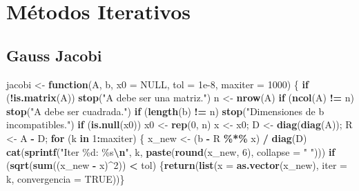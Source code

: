 \documentclass[
]{book}
\newenvironment{Shaded}{\begin{snugshade}}{\end{snugshade}}
\newcommand{\AttributeTok}[1]{\textcolor[rgb]{0.13,0.29,0.53}{#1}}
\newcommand{\ConstantTok}[1]{\textcolor[rgb]{0.56,0.35,0.01}{#1}}
\newcommand{\ControlFlowTok}[1]{\textcolor[rgb]{0.13,0.29,0.53}{\textbf{#1}}}
\newcommand{\DecValTok}[1]{\textcolor[rgb]{0.00,0.00,0.81}{#1}}
\newcommand{\FloatTok}[1]{\textcolor[rgb]{0.00,0.00,0.81}{#1}}
\newcommand{\FunctionTok}[1]{\textcolor[rgb]{0.13,0.29,0.53}{\textbf{#1}}}
\newcommand{\NormalTok}[1]{#1}
\newcommand{\OtherTok}[1]{\textcolor[rgb]{0.56,0.35,0.01}{#1}}
\newcommand{\SpecialCharTok}[1]{\textcolor[rgb]{0.81,0.36,0.00}{\textbf{#1}}}
\newcommand{\StringTok}[1]{\textcolor[rgb]{0.31,0.60,0.02}{#1}}
\begin{document}
\chapter{Métodos Iterativos}\label{muxe9todos-iterativos}

\section{Gauss Jacobi}\label{gauss-jacobi}

\begin{Shaded}
\begin{Highlighting}[]
\NormalTok{jacobi }\OtherTok{\textless{}{-}} \ControlFlowTok{function}\NormalTok{(A, b, }\AttributeTok{x0 =} \ConstantTok{NULL}\NormalTok{, }\AttributeTok{tol =} \FloatTok{1e{-}8}\NormalTok{, }\AttributeTok{maxiter =} \DecValTok{1000}\NormalTok{) \{}
  \ControlFlowTok{if}\NormalTok{ (}\SpecialCharTok{!}\FunctionTok{is.matrix}\NormalTok{(A)) }\FunctionTok{stop}\NormalTok{(}\StringTok{"A debe ser una matriz."}\NormalTok{)}
\NormalTok{  n }\OtherTok{\textless{}{-}} \FunctionTok{nrow}\NormalTok{(A)}
  \ControlFlowTok{if}\NormalTok{ (}\FunctionTok{ncol}\NormalTok{(A) }\SpecialCharTok{!=}\NormalTok{ n) }\FunctionTok{stop}\NormalTok{(}\StringTok{"A debe ser cuadrada."}\NormalTok{)}
  \ControlFlowTok{if}\NormalTok{ (}\FunctionTok{length}\NormalTok{(b) }\SpecialCharTok{!=}\NormalTok{ n) }\FunctionTok{stop}\NormalTok{(}\StringTok{"Dimensiones de b incompatibles."}\NormalTok{)}
  \ControlFlowTok{if}\NormalTok{ (}\FunctionTok{is.null}\NormalTok{(x0)) x0 }\OtherTok{\textless{}{-}} \FunctionTok{rep}\NormalTok{(}\DecValTok{0}\NormalTok{, n)}
\NormalTok{  x }\OtherTok{\textless{}{-}}\NormalTok{ x0;  D }\OtherTok{\textless{}{-}} \FunctionTok{diag}\NormalTok{(}\FunctionTok{diag}\NormalTok{(A));  R }\OtherTok{\textless{}{-}}\NormalTok{ A }\SpecialCharTok{{-}}\NormalTok{ D;}
  \ControlFlowTok{for}\NormalTok{ (k }\ControlFlowTok{in} \DecValTok{1}\SpecialCharTok{:}\NormalTok{maxiter) \{}
\NormalTok{    x\_new }\OtherTok{\textless{}{-}}\NormalTok{ (b }\SpecialCharTok{{-}}\NormalTok{ R }\SpecialCharTok{\%*\%}\NormalTok{ x) }\SpecialCharTok{/} \FunctionTok{diag}\NormalTok{(D)}
    \FunctionTok{cat}\NormalTok{(}\FunctionTok{sprintf}\NormalTok{(}\StringTok{"Iter \%d: \%s}\SpecialCharTok{\textbackslash{}n}\StringTok{"}\NormalTok{, k, }\FunctionTok{paste}\NormalTok{(}\FunctionTok{round}\NormalTok{(x\_new, }\DecValTok{6}\NormalTok{), }\AttributeTok{collapse =} \StringTok{" "}\NormalTok{)))}
    \ControlFlowTok{if}\NormalTok{ (}\FunctionTok{sqrt}\NormalTok{(}\FunctionTok{sum}\NormalTok{((x\_new }\SpecialCharTok{{-}}\NormalTok{ x)}\SpecialCharTok{\^{}}\DecValTok{2}\NormalTok{)) }\SpecialCharTok{\textless{}}\NormalTok{ tol) \{}\FunctionTok{return}\NormalTok{(}\FunctionTok{list}\NormalTok{(}\AttributeTok{x =} \FunctionTok{as.vector}\NormalTok{(x\_new), }\AttributeTok{iter =}\NormalTok{ k, }\AttributeTok{convergencia =} \ConstantTok{TRUE}\NormalTok{))\}}

\end{Highlighting}
\end{Shaded}
\end{document}
